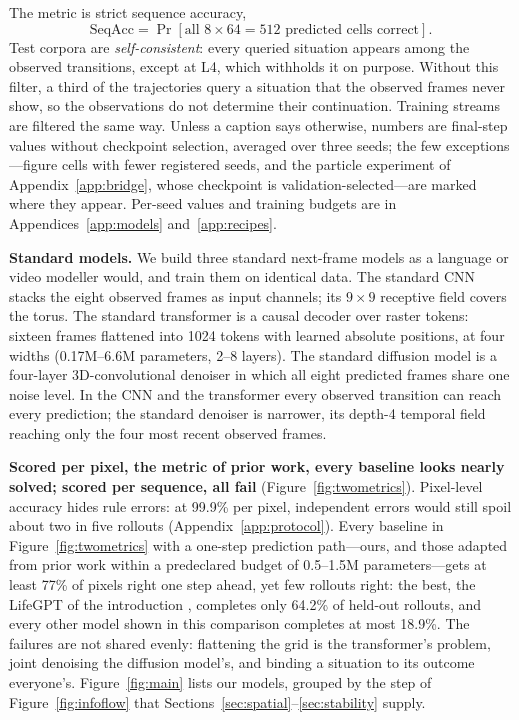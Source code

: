 \documentclass[11pt]{article}
\begin{document}
The metric is strict sequence accuracy,
\begin{equation}
\mathrm{SeqAcc}=\Pr\!\left[\text{all } 8\times 64 = 512 \text{ predicted cells correct}\right].
\end{equation}
Test corpora are \emph{self-consistent}: every queried situation appears among the observed transitions, except at L4, which withholds it on purpose. Without this filter, a third of the trajectories query a situation that the observed frames never show, so the observations do not determine their continuation. Training streams are filtered the same way. Unless a caption says otherwise, numbers are final-step values without checkpoint selection, averaged over three seeds; the few exceptions---figure cells with fewer registered seeds, and the particle experiment of Appendix~\ref{app:bridge}, whose checkpoint is validation-selected---are marked where they appear. Per-seed values and training budgets are in Appendices~\ref{app:models} and~\ref{app:recipes}.

\textbf{Standard models.} We build three standard next-frame models as a language or video modeller would, and train them on identical data. The standard CNN stacks the eight observed frames as input channels; its $9{\times}9$ receptive field covers the torus. The standard transformer is a causal decoder over raster tokens: sixteen frames flattened into 1024 tokens with learned absolute positions, at four widths (0.17M--6.6M parameters, 2--8 layers). The standard diffusion model is a four-layer 3D-convolutional denoiser in which all eight predicted frames share one noise level. In the CNN and the transformer every observed transition can reach every prediction; the standard denoiser is narrower, its depth-4 temporal field reaching only the four most recent observed frames.

\textbf{Scored per pixel, the metric of prior work, every baseline looks nearly solved; scored per sequence, all fail} (Figure~\ref{fig:twometrics}). Pixel-level accuracy \citep{berkovich2025lifegpt, berkovich2026automatagpt, burtsev2024learning} hides rule errors: at 99.9\% per pixel, independent errors would still spoil about two in five rollouts (Appendix~\ref{app:protocol}). Every baseline in Figure~\ref{fig:twometrics} with a one-step prediction path---ours, and those adapted from prior work within a predeclared budget of 0.5--1.5M parameters---gets at least 77\% of pixels right one step ahead, yet few rollouts right: the best, the LifeGPT of the introduction \citep{berkovich2025lifegpt}, completes only 64.2\% of held-out rollouts, and every other model shown in this comparison completes at most 18.9\%. The failures are not shared evenly: flattening the grid is the transformer's problem, joint denoising the diffusion model's, and binding a situation to its outcome everyone's. Figure~\ref{fig:main} lists our models, grouped by the step of Figure~\ref{fig:infoflow} that Sections~\ref{sec:spatial}--\ref{sec:stability} supply.
\end{document}
